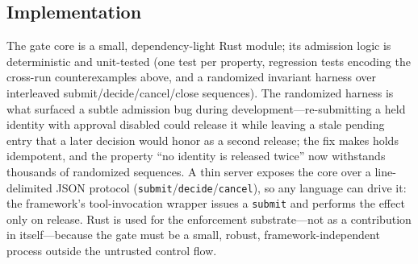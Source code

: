 \documentclass[10pt,journal,compsoc]{IEEEtran}
\begin{document}
\subsection{Implementation}
\label{sec:impl}
The gate core is a small, dependency-light Rust module; its admission logic is
deterministic and unit-tested (one test per property, regression tests
encoding the cross-run counterexamples above, and a randomized
invariant harness over interleaved submit/decide/cancel/close sequences).
The randomized harness is what surfaced a subtle admission bug during
development---re-submitting a held identity with approval disabled could
release it while leaving a stale pending entry that a later decision would
honor as a second release; the fix makes holds idempotent, and the property
``no identity is released twice'' now withstands thousands of randomized
sequences. A thin server exposes the
core over a line-delimited JSON protocol
(\texttt{submit}/\texttt{decide}/\texttt{cancel}), so any language can drive it:
the framework's tool-invocation wrapper issues a \texttt{submit} and performs the
effect only on \textsf{release}. Rust is used for the enforcement substrate---not
as a contribution in itself---because the gate must be a small, robust,
framework-independent process outside the untrusted control flow.
\end{document}
